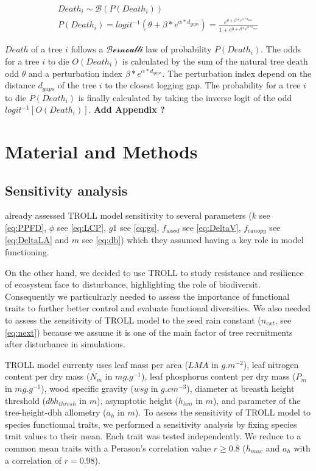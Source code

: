 \documentclass[12pt,]{article}
\let\oldsection\section
\renewcommand\section{\newpage\oldsection}
\theoremstyle{definition}
\theoremstyle{definition}
\theoremstyle{remark}
\begin{document}
\begin{equation}
  \begin{array}{c} 
    Death_i \sim \mathcal{B}(P(Death_i)) \\
    P(Death_i) = logit^{-1}(\theta + \beta*e^{\alpha*d_{gaps}}) = \frac{e^{\theta + \beta*e^{\alpha*d_{gaps}}}}{1 + e^{\theta + \beta*e^{\alpha*d_{gaps}}}}
  \end{array}
  \label{eq:death}
\end{equation}

\(Death\) of a tree \(i\) follows a \(\mathcal{Bernoulli}\) law of
probability \(P(Death_i)\). The odds for a tree \(i\) to die
\(O(Death_i)\) is calculated by the sum of the natural tree death odd
\(\theta\) and a perturbation index \(\beta*e^{\alpha*d_{gaps}}\). The
perturbation index depend on the distance \(d_{gaps}\) of the tree \(i\)
to the closest logging gap. The probability for a tree \(i\) to die
\(P(Death_i)\) is finally calculated by taking the inverse logit of the
odd \(logit^{-1}[O(Death_i)]\). \textbf{Add Appendix ?}

\section{Material and Methods}\label{material-and-methods}

\subsection{Sensitivity analysis}\label{sensitivity-analysis}

\citet{Li} already assessed TROLL model sensitivity to several
parameters (\(k\) see \eqref{eq:PPFD}, \(\phi\) see \eqref{eq:LCP}, \(g1\)
see \eqref{eq:gs}, \(f_{wood}\) see \eqref{eq:DeltaV}, \(f_{canopy}\) see
\eqref{eq:DeltaLA} and \(m\) see \eqref{eq:db}) which they assumed having a
key role in model functioning.

On the other hand, we decided to use TROLL to study resistance and
resilience of ecosystem face to disturbance, highlighting the role of
biodiversit. Consequently we particulrarly needed to assess the
importance of functional traits to further better control and evaluate
functional diversities. We also needed to assess the sensitivity of
TROLL model to the seed rain constant (\(n_{ext}\), see \eqref{eq:next})
because we assume it is one of the main factor of tree recruitments
after disturbance in simulations.

TROLL model currenty uses leaf mass per area (\(LMA\) in \(g.m^{-2}\)),
leaf nitrogen content per dry mass (\(N_m\) in \(mg.g^{-1}\)), leaf
phosphorus content per dry mass (\(P_m\) in \(mg.g^{-1}\)), wood
specific gravity (\(wsg\) in \(g.cm^{-3}\)), diameter at breasth height
threshold (\(dbh_{thresh}\) in \(m\)), asymptotic height (\(h_{lim}\) in
\(m\)), and parameter of the tree-height-dbh allometry (\(a_h\) in
\(m\)). To assess the sensitivity of TROLL model to species functionnal
traits, we performed a sensitivity analysis by fixing species trait
values to their mean. Each trait was tested independently. We reduce to
a common mean traits with a Perason's correlation value \(r \geq 0.8\)
(\(h_{max}\) and \(a_h\) with a correlation of \(r=0.98\)).
\end{document}
